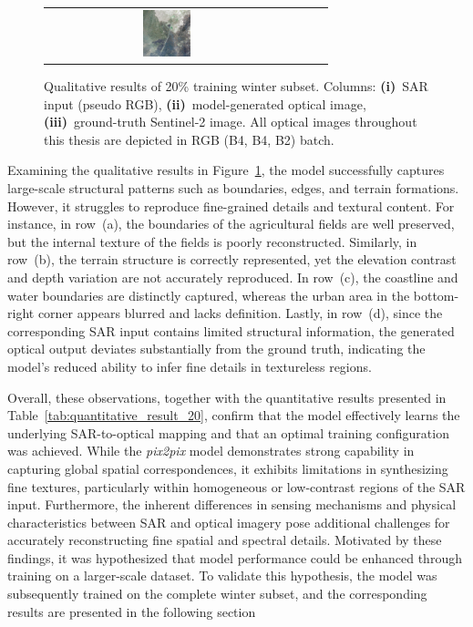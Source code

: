 \begin{figure}[h!]
\begin{tabular}{c *{3}{c}}
        \includegraphics[width=0.2\textwidth, height=0.2\textheight, keepaspectratio]{img/qualitative-20/sample_7/gt.png} \\
    \end{tabular}

    \caption[Qualitative results of 20\% training winter subset]{%
    Qualitative results of 20\% training winter subset.
    Columns: 
    \textbf{(i)}~SAR input (pseudo RGB), 
    \textbf{(ii)}~model-generated optical image, 
    \textbf{(iii)}~ground-truth Sentinel-2 image. All optical images throughout this thesis are depicted in RGB (B4, B4, B2) batch.}
    \label{fig:qualitative_results_20}
\end{figure}

Examining the qualitative results in Figure~\ref{fig:qualitative_results_20}, the model successfully captures large-scale structural patterns such as boundaries, edges, and terrain formations. However, it struggles to reproduce fine-grained details and textural content. For instance, in row~(a), the boundaries of the agricultural fields are well preserved, but the internal texture of the fields is poorly reconstructed. Similarly, in row~(b), the terrain structure is correctly represented, yet the elevation contrast and depth variation are not accurately reproduced. In row~(c), the coastline and water boundaries are distinctly captured, whereas the urban area in the bottom-right corner appears blurred and lacks definition. Lastly, in row~(d), since the corresponding SAR input contains limited structural information, the generated optical output deviates substantially from the ground truth, indicating the model’s reduced ability to infer fine details in textureless regions.


Overall, these observations, together with the quantitative results presented in Table~\ref{tab:quantitative_result_20}, confirm that the model effectively learns the underlying SAR-to-optical mapping and that an optimal training configuration was achieved. While the \textit{pix2pix} model demonstrates strong capability in capturing global spatial correspondences, it exhibits limitations in synthesizing fine textures, particularly within homogeneous or low-contrast regions of the SAR input. Furthermore, the inherent differences in sensing mechanisms and physical characteristics between SAR and optical imagery pose additional challenges for accurately reconstructing fine spatial and spectral details. Motivated by these findings, it was hypothesized that model performance could be enhanced through training on a larger-scale dataset. To validate this hypothesis, the model was subsequently trained on the complete winter subset, and the corresponding results are presented in the following section

